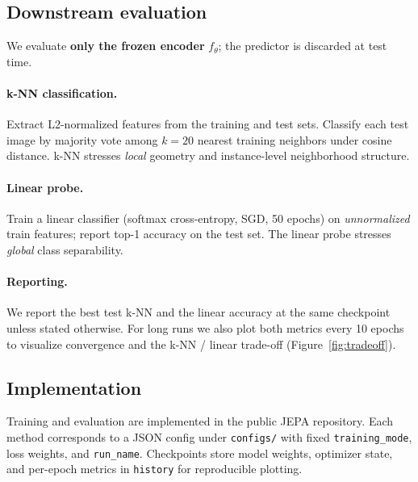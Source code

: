 \subsection{Downstream evaluation}
\label{sec:eval-metrics}

We evaluate \textbf{only the frozen encoder} $f_\theta$; the predictor is
discarded at test time.

\paragraph{k-NN classification.}
Extract L2-normalized features from the training and test sets.
Classify each test image by majority vote among $k{=}20$ nearest training
neighbors under cosine distance.
k-NN stresses \emph{local} geometry and instance-level neighborhood structure.

\paragraph{Linear probe.}
Train a linear classifier (softmax cross-entropy, SGD, 50 epochs) on
\emph{unnormalized} train features; report top-1 accuracy on the test set.
The linear probe stresses \emph{global} class separability.

\paragraph{Reporting.}
We report the best test k-NN and the linear accuracy at the same checkpoint
unless stated otherwise.
For long runs we also plot both metrics every 10 epochs to visualize
convergence and the k-NN / linear trade-off
(Figure~\ref{fig:tradeoff}).

\subsection{Implementation}
\label{sec:eval-impl}

Training and evaluation are implemented in the public JEPA repository.
Each method corresponds to a JSON config under \texttt{configs/} with fixed
\texttt{training\_mode}, loss weights, and \texttt{run\_name}.
Checkpoints store model weights, optimizer state, and per-epoch metrics in
\texttt{history} for reproducible plotting.
